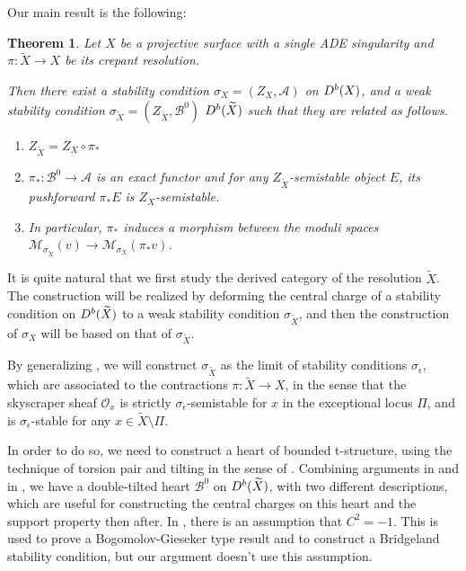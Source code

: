 \documentclass[12pt]{amsart}
\newtheorem{theorem}{Theorem}[section]
\theoremstyle{definition}
\begin{document}
Our main result is the following:
\begin{theorem}\label{main1}
Let $X$ be a projective surface with a single ADE singularity and $\pi \colon \widetilde{X} \longrightarrow X$ be its crepant resolution. 

Then there exist a stability condition $\sigma_X=(Z_X, \mathcal{A})$ on ${\rm D}^b(X)$,
and a weak stability condition $\sigma_{\widetilde{X}} = (Z_{\widetilde{X}},\mathcal{B}^0)$ ${\rm D}^b(\widetilde{X})$
such that they are related as follows.
\begin{enumerate}
    \item[(1)] $Z_{\widetilde{X}} = Z_X \circ \pi_\ast$ 
    \item[(2)] $\pi_\ast \colon \mathcal{B}^0 \longrightarrow \mathcal{A}$ is an exact functor and for any $Z_{\widetilde{X}}$-semistable object $E$, its pushforward $\pi_\ast E$ is $Z_X$-semistable.
    \item[(3)] In particular, $\pi_\ast$ induces a morphism between the moduli spaces $\mathcal{M}_{\sigma_{\widetilde{X}}}(v) \longrightarrow \mathcal{M}_{\sigma_X}(\pi_\ast v)$.
\end{enumerate}
\end{theorem}



It is quite natural that we first study the derived category of the resolution $\widetilde{X}$.
The construction will be realized by deforming the central charge of a stability condition on ${\rm D}^b(\widetilde{X})$ to a weak stability condition $\sigma_{\widetilde{X}}$,
and then the construction of $\sigma_X$ will be based on that of $\sigma_{\widetilde{X}}$.

By generalizing \cite[Sect. 5,6]{TX22},
we will construct $\sigma_{\widetilde{X}}$ as the limit of stability conditions $\sigma_{\epsilon}$,
which are associated to the contractions $\pi \colon \widetilde{X} \longrightarrow X$,
in the sense that the skyscraper sheaf $\mathcal{O}_x$ is strictly $\sigma_{\epsilon}$-semistable for $x$ in the exceptional locus $\Pi$,
and is $\sigma_{\epsilon}$-stable for any $x \in\widetilde{X} \setminus \Pi$.

In order to do so, we need to construct a heart of bounded t-structure,
using the technique of torsion pair and tilting in the sense of \cite{HRS96}.
Combining arguments in \cite{Tod13} and in \cite[Sect. 3]{TX22}, we have a double-tilted heart $\mathcal{B}^0$ on ${\rm D}^b(\widetilde{X})$, with two different descriptions,
which are useful for constructing the central charges on this heart and the support property then after.
In \cite[Sect. 3]{Tod13}, there is an assumption that $C^2=-1$. 
This is used to prove a Bogomolov-Gieseker type result and to construct a Bridgeland stability condition,
but our argument doesn't use this assumption.
\end{document}
